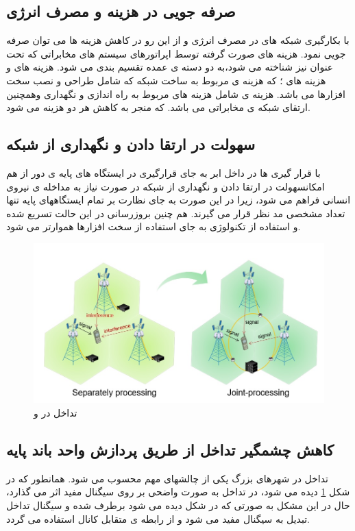 \subsection{صرفه جویی در هزینه و مصرف انرژی }
با بکارگیری شبکه های  در مصرف انرژی و از این
رو در کاهش هزینه ها می توان صرفه جویی نمود.
هزینه
های صورت گرفته توسط اپراتورهای سیستم های مخابراتی
که تحت عنوان  نیز شناخته می شود،به دو دسته
ی عمده تقسیم بندی می شود. هزینه های  و
هزینه های ؛
که هزینه ی  مربوط به ساخت شبکه که شامل طراحی و نصب سخت افزارها می باشد. هزینه ی  شامل هزینه های مربوط به راه اندازی و نگهداری وهمچنین
ارتقای شبکه ی مخابراتی می باشد. که  منجر به کاهش هر دو هزینه می شود.
\subsection{سهولت در ارتقا دادن و نگهداری از شبکه}
با قرار گیری   ها در داخل ابر به جای قرارگیری در
ایستگاه های پایه ی دور از هم امکانسهولت در ارتقا دادن و نگهداری از شبکه در صورت نیاز به مداخله ی نیروی انسانی
فراهم می شود، زیرا در این صورت به جای نظارت بر تمام
ایستگاههای پایه تنها تعداد مشخصی  مد نظر
قرار می گیرند. هم چنین بروزرسانی  در این حالت
تسریع شده و استفاده از تکنولوژی  به جای استفاده از
سخت افزارها هموارتر می شود.
\begin{figure}
  \centering
    \includegraphics[width=\textwidth]{c55}
  \caption{تداخل در  و  \cite{WinNT}}
  \label{fig:c55}
\end{figure}
\subsection{کاهش چشمگیر تداخل از طریق پردازش واحد باند پایه }
تداخل در شهرهای بزرگ یکی از چالشهای مهم محسوب می شود. \newline
همانطور که در شکل \ref{fig:c55} دیده می شود، در  تداخل به صورت واضحی بر روی سیگنال مفید اثر می گذارد، حال در  این مشکل به صورتی که در شکل دیده می شود برطرف شده و سیگنال تداخل تبدیل به سیگنال مفید می شود و از رابطه ی متقابل کانال   استفاده می گردد.

